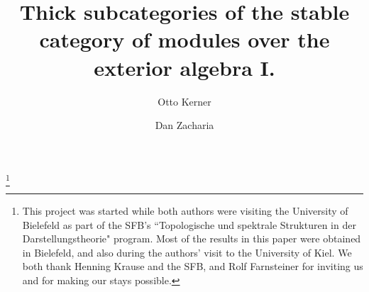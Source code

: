 \documentclass[10pt]{amsart}
\begin{document}
\newtheorem{prop}{Proposition}[section]

\newtheorem{thm}[prop]{Theorem}
\newtheorem{lemma}[prop]{Lemma}
\newtheorem{cor}[prop]{Corollary}
\newtheorem{dfn}[prop]{Definition}
\newtheorem{pro}[prop]{Proposition}
\theoremstyle{definition}
\newtheorem{Question}[prop]{Question}
\newtheorem{Example}[prop]{Example}
\newtheorem{Examples}[prop]{Examples}
\newtheorem{Remark}[prop]{Remark}
\newcommand{\ann}{\mbox{ann}}
\newcommand{\depth}{\mbox{depth}}
\newcommand{\br}{{\bf r}}
\newcommand{\md}{\operatorname{mod}}
\newcommand{\finmd}{\operatorname{fin-mod}}
\newcommand{\add}{\operatorname{add}}
\newcommand{\End}{\operatorname{End}}
\newcommand{\Hom}{\operatorname{Hom}}
\renewcommand{\Im}{\mbox{Im}}
\newcommand{\pd}{\mbox{pd}}
\newcommand{\Ker}{\mbox{Ker}}
\newcommand{\Coker}{\mbox{Coker}}
\newcommand{\coh}{\operatorname{coh}}
\newcommand{\soc}{\mbox{soc}}
\newcommand{\Tor}{\mbox{Tor}}
\newcommand{\Spec}{\mbox{Spec}}
\newcommand{\tp}{\mbox{top}}
\renewcommand{\dim}{\mbox{dim}}
\newcommand{\rad}{\mbox{rad}}
\newcommand{\gldim}{\mbox{gl.dim}}
\newcommand{\nilmd}{\operatorname{nilmod}}
\newcommand{\Ext}{\operatorname{Ext}\nolimits}
\newcommand{\op}{^{\mbox{op}}}
\newcommand{\pr}{^{\prime}}
\newcommand{\f}{\operatorname{fin}}
\newcommand{\Supp}{\operatorname{Supp}}
\newcommand{\semi}{\mathbin{\vcenter{\hbox{$\scriptscriptstyle|$}}
\;\!\!\!\times }}
\newcommand{\cx}{\operatorname{cx}\nolimits}
\renewcommand{\depth}{\operatorname{depth}\nolimits}
\newcommand{\dm}{\operatorname{dim}\nolimits}
\newcommand{\rk}{\operatorname{rk}\nolimits}
\newcommand{\mto}{\hookrightarrow} 
\newcommand{\da}{\downarrow} 
\newcommand{\str}{\stackrel}
\newcommand{\ra}{\rightarrow}
 \newcommand{\lra}{\longrightarrow}
\newcommand{\AR} {Auslander-Reiten }
\newcommand{\Tr}{\operatorname{Tr}\nolimits}
\newcommand{\cF}{\mathcal F}
\newcommand{\rank}{\operatorname{rank}\nolimits}

\title[Thick subcategories of the stable category]
{Thick subcategories of the stable category of modules over the exterior algebra I.}

\author{Otto Kerner}\address{Mathematisches Institut
\\Heinrich-Heine-Universit\"at \\ 40225 D\"usseldorf\\ 
Germany} \author{Dan Zacharia}
\address{Department of Mathematics\\Syracuse University\\Syracuse
13244\\USA} \thanks{This project was started
 while both authors were visiting the University of 
Bielefeld as part of the SFB's ``Topologische und spektrale 
Strukturen in der Darstellungstheorie" program. Most of the results in this paper were obtained in Bielefeld, and also during the authors' visit to the University of Kiel. We both thank Henning Krause and  
the SFB, and Rolf Farnsteiner for inviting us and for making our stays possible. } 
\end{document}
